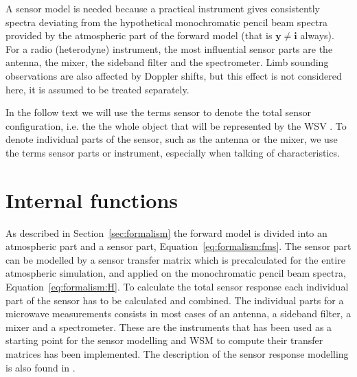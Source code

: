 %
%

A sensor model is needed because a practical instrument gives
consistently spectra deviating from the hypothetical monochromatic
pencil beam spectra provided by the atmospheric part of the forward
model (that is $\mathbf{y} \neq \mathbf{i}$ always). For a radio (heterodyne)
instrument, the most influential sensor parts are the antenna, the
mixer, the sideband filter and the spectrometer. Limb sounding
observations are also affected by Doppler shifts, but this effect is
not considered here, it is assumed to be treated separately.

In the follow text we will use the terms sensor to denote the total
sensor configuration, i.e. the the whole object that will be
represented by the WSV . To denote 
individual parts of the sensor, such as the antenna or the mixer, we
use the terms sensor parts or instrument, especially when talking
of characteristics.

\section{Internal functions}
As described in Section~\ref{sec:formalism} the forward model is divided into an atmospheric
part and a sensor part, Equation~\ref{eq:formalism:fms}. The sensor part can be modelled by a
sensor transfer matrix which is precalculated for the entire atmospheric simulation, and applied on the monochromatic pencil beam spectra, Equation~\ref{eq:formalism:H}. To calculate the total sensor response each individual part of the sensor has to be calculated and combined.
The individual parts for a microwave measurements consists in most cases of an antenna, a sideband filter, a mixer and a spectrometer. These are the instruments that has been used as a starting point for the sensor modelling and WSM to compute their transfer matrices has been implemented. The description of the sensor response modelling is also found in \citet{eriksson:06}. 
 
